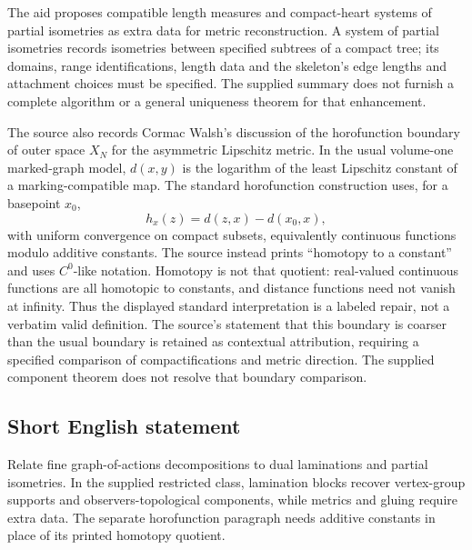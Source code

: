 \documentclass[11pt]{article}
\begin{document}
The aid proposes compatible length measures and compact-heart systems of partial isometries as extra data for metric reconstruction. A system of partial isometries records isometries between specified subtrees of a compact tree; its domains, range identifications, length data and the skeleton's edge lengths and attachment choices must be specified. The supplied summary does not furnish a complete algorithm or a general uniqueness theorem for that enhancement.

The source also records Cormac Walsh's discussion of the horofunction boundary of outer space \(X_N\) for the asymmetric Lipschitz metric. In the usual volume-one marked-graph model, \(d(x,y)\) is the logarithm of the least Lipschitz constant of a marking-compatible map. The standard horofunction construction uses, for a basepoint \(x_0\),
\[
 h_x(z)=d(z,x)-d(x_0,x),
\]
with uniform convergence on compact subsets, equivalently continuous functions modulo additive constants. The source instead prints ``homotopy to a constant'' and uses \(C^0\)-like notation. Homotopy is not that quotient: real-valued continuous functions are all homotopic to constants, and distance functions need not vanish at infinity. Thus the displayed standard interpretation is a labeled repair, not a verbatim valid definition. The source's statement that this boundary is coarser than the usual boundary is retained as contextual attribution, requiring a specified comparison of compactifications and metric direction. The supplied component theorem does not resolve that boundary comparison.
\subsection{Short English statement}
Relate fine graph-of-actions decompositions to dual laminations and partial isometries. In the supplied restricted class, lamination blocks recover vertex-group supports and observers-topological components, while metrics and gluing require extra data. The separate horofunction paragraph needs additive constants in place of its printed homotopy quotient.
\end{document}
